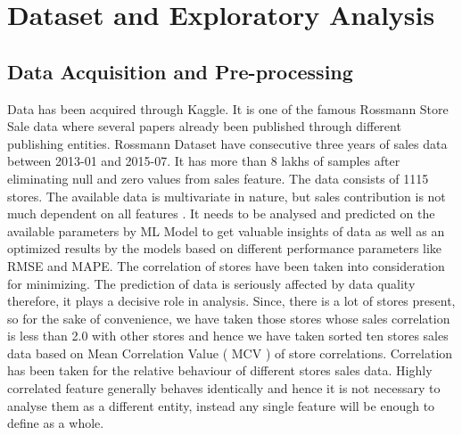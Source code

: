 
\chapter{Dataset and Exploratory Analysis} %

\label{c3} %

\section{Data Acquisition and Pre-processing}
Data has been acquired through Kaggle. It is one of the famous Rossmann Store Sale \cite{sazontyevrossmann} data where several papers already been published through different publishing entities. Rossmann Dataset have consecutive three years of sales data between 2013-01 and 2015-07. It has more than 8 lakhs of samples after eliminating null and zero values from sales feature. The data consists of 1115 stores. The available data is multivariate in nature, but sales contribution is not much dependent on all features \cite{kim2019bilstm}. It needs to be analysed and predicted on the available parameters by ML Model to get valuable insights of data as well as an optimized results by the models based on different performance parameters like RMSE and MAPE. The correlation of stores have been taken into consideration for minimizing. The prediction of data is seriously affected by data quality therefore, it plays a decisive role in analysis. Since, there is a lot of stores present, so for the sake of convenience, we have taken those stores whose sales correlation is less than 2.0 with other stores and hence we have taken sorted ten stores sales data based on Mean Correlation Value ( MCV ) of store correlations. Correlation \cite{habets2009new} has been taken for the relative behaviour of different stores sales data. Highly correlated feature generally behaves identically and hence it is not necessary to analyse them as a different entity, instead any single feature will be enough to define as a whole. 

